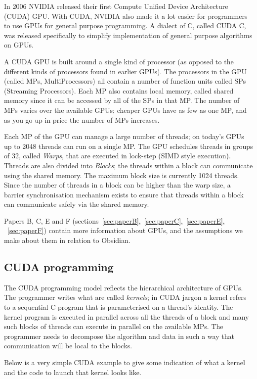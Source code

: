 \documentclass[a4paper]{book}
\begin{document}
In 2006 NVIDIA released their first Compute Unified Device Architecture (CUDA) 
GPU. With CUDA, NVIDIA also made it a lot easier for programmers to use GPUs 
for general purpose programming. A dialect of C, called CUDA C, was released specifically 
to simplify implementation of general purpose algorithms on GPUs. 

A CUDA GPU is built around a single kind of processor (as opposed to the different 
kinds of processors found in earlier GPUs). The processors in the GPU (called MPs, 
MultiProcessors) all contain a number of function units called SPs (Streaming Processors). 
Each MP also contains local memory, called shared memory since it can be accessed 
by all of the SPs in that MP. The number of MPs varies over the available GPUs; cheaper 
GPUs have as few as one MP, and as you go up in price the number of MPs increases.

Each MP of the GPU can manage a large number of threads; on today's GPUs up to 
2048 threads can run on a single MP. The GPU schedules threads in groups of 32, called 
{\em Warps}, that are executed in lock-step (SIMD style execution). Threads are 
also divided into {\em Blocks}; the threads within a block can communicate using the 
shared memory. The maximum block size is currently 1024 threads. Since 
the number of threads in a block can be higher than the warp size, a barrier 
synchronisation mechanism exists to ensure that threads within a block 
can communicate safely via the shared memory. 


Papers B, C, E and F (sections~\ref{sec:paperB},~\ref{sec:paperC},~\ref{sec:paperE},
~\ref{sec:paperF}) contain more information about GPUs, and the assumptions we make 
about them in relation to Obsidian. 

\subsection{CUDA programming} 

The CUDA programming model reflects the hierarchical architecture of GPUs. The programmer 
writes what are called {\em kernels}; in CUDA jargon a kernel refers to a sequential C program 
that is parameterised on a thread's identity. The kernel program is executed in parallel across 
all the threads of a block and many such blocks of threads can execute in parallel on the 
available MPs. The programmer needs to decompose the algorithm and data in such a way that 
communication will be local to the blocks. 

Below is a very simple CUDA example to give some indication of what a kernel and 
the code to launch that kernel looks like. 
\end{document}
